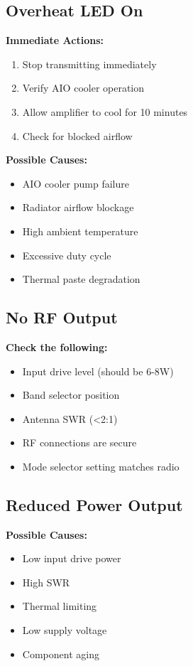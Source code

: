 \documentclass[11pt,a4paper]{article}
\begin{document}
\subsection{Overheat LED On}
\textbf{Immediate Actions:}
\begin{enumerate}
    \item Stop transmitting immediately
    \item Verify AIO cooler operation
    \item Allow amplifier to cool for 10 minutes
    \item Check for blocked airflow
\end{enumerate}

\textbf{Possible Causes:}
\begin{itemize}
    \item AIO cooler pump failure
    \item Radiator airflow blockage
    \item High ambient temperature
    \item Excessive duty cycle
    \item Thermal paste degradation
\end{itemize}

\subsection{No RF Output}
\textbf{Check the following:}
\begin{itemize}
    \item Input drive level (should be 6-8W)
    \item Band selector position
    \item Antenna SWR (<2:1)
    \item RF connections are secure
    \item Mode selector setting matches radio
\end{itemize}

\subsection{Reduced Power Output}
\textbf{Possible Causes:}
\begin{itemize}
    \item Low input drive power
    \item High SWR
    \item Thermal limiting
    \item Low supply voltage
    \item Component aging
\end{itemize}
\end{document}
